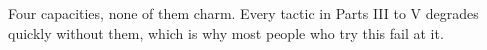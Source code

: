 
\begin{chapterblurb}
Four capacities, none of them charm. Every tactic in Parts III to V degrades quickly without them, which is why most people who try this fail at it.
\end{chapterblurb}
